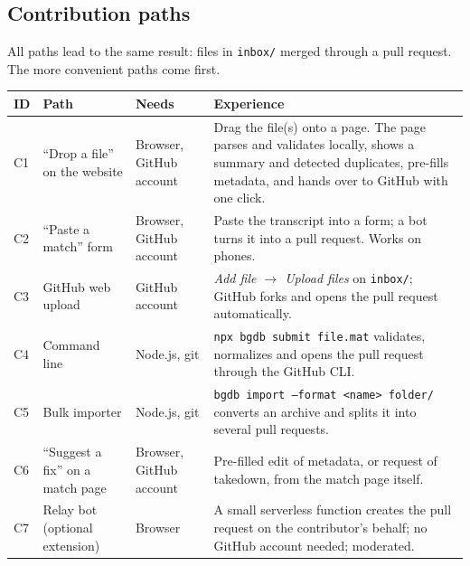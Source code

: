 \documentclass[11pt,a4paper]{article}
\begin{document}
\subsection{Contribution paths}\label{sec:paths}
All paths lead to the same result: files in \texttt{inbox/} merged through a pull request. The more convenient paths come first.
\begin{longtable}{@{}p{0.8cm}p{3.0cm}p{3.0cm}p{6.8cm}@{}}
\toprule
\textbf{ID} & \textbf{Path} & \textbf{Needs} & \textbf{Experience}\\
\midrule
\endhead
C1 & ``Drop a file'' on the website & Browser, GitHub account & Drag the file(s) onto a page. The page parses and validates locally, shows a summary and detected duplicates, pre-fills metadata, and hands over to GitHub with one click.\\
C2 & ``Paste a match'' form & Browser, GitHub account & Paste the transcript into a form; a bot turns it into a pull request. Works on phones.\\
C3 & GitHub web upload & GitHub account & \emph{Add file $\rightarrow$ Upload files} on \texttt{inbox/}; GitHub forks and opens the pull request automatically.\\
C4 & Command line & Node.js, git & \texttt{npx bgdb submit file.mat} validates, normalizes and opens the pull request through the GitHub CLI.\\
C5 & Bulk importer & Node.js, git & \texttt{bgdb import --format <name> folder/} converts an archive and splits it into several pull requests.\\
C6 & ``Suggest a fix'' on a match page & Browser, GitHub account & Pre-filled edit of metadata, or request of takedown, from the match page itself.\\
C7 & Relay bot (optional extension) & Browser & A small serverless function creates the pull request on the contributor's behalf; no GitHub account needed; moderated.\\
\bottomrule
\end{longtable}
\end{document}
